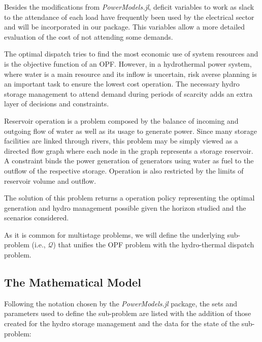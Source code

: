 \documentclass{juliacon}
\begin{document}
Besides the modifications from \textit{PowerModels.jl}, deficit variables to work as slack to the attendance of each load have frequently been used by the electrical sector and will be incorporated in our package. This variables allow a more detailed evaluation of the cost of not attending some demands. 

The optimal dispatch tries to find the most economic use of system resources and is the objective function of an OPF. However, in a hydrothermal power system, where water is a main resource and its inflow is uncertain, risk averse planning is an important task to ensure the lowest cost operation. The necessary hydro storage management to attend demand during periods of scarcity adds an extra layer of decisions and constraints.

Reservoir operation is a problem composed by the balance of incoming and outgoing flow of water as well as its usage to generate power. Since many storage facilities are linked through rivers, this problem may be simply viewed as a directed flow graph where each node in the graph represents a storage reservoir. A constraint binds the power generation of generators using water as fuel to the outflow of the respective storage. Operation is also restricted by the limits of reservoir volume and outflow.

The solution of this problem returns a operation policy representing the optimal generation and hydro management possible given the horizon studied and the scenarios considered.

As it is common for multistage problems, we will define the underlying sub-problem (i.e., $\mathcal{Q}$) that unifies the OPF problem with the hydro-thermal dispatch problem.

\subsection{The Mathematical Model}
\label{subsub:mathmodel}

Following the notation chosen by the \textit{PowerModels.jl} package, the sets and parameters used to define the sub-problem are listed with the addition of those created for the hydro storage management and the data for the state of the sub-problem:
\end{document}
